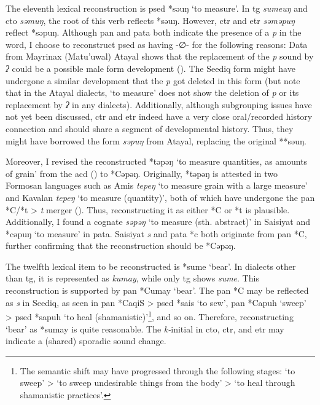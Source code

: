 The eleventh lexical reconstruction is \acl{psed} *səuŋ `to measure'. In \acl{tg} \textit{sumeuŋ} and \acl{cto} \textit{səmuŋ}, the root of this verb reflects *səuŋ. However, \acl{ctr} and \acl{etr} \textit{səməpuŋ} reflect *səpuŋ. Although \acl{pan} and \acl{pata} both indicate the presence of a \textit{p} in the word, I choose to reconstruct \acl{psed} as having -∅- for the following reasons: Data from Mayrinax (Matu'uwal) Atayal shows that the replacement of the \textit{p} sound by \textit{ʔ} could be a possible male form development (\cite[12]{li1983gender}). The Seediq form might have undergone a similar development that the \textit{p} got deleted in this form (but note that in the Atayal dialects, `to measure' does not show the deletion of \textit{p} or its replacement by \textit{ʔ} in any dialects). Additionally, although subgrouping issues have not yet been discussed, \acl{ctr} and \acl{etr} indeed have a very close oral/recorded history connection and should share a segment of developmental history. Thus, they might have borrowed the form \textit{səpuŋ} from Atayal, replacing the original **səuŋ.

Moreover, I revised the reconstructed *təpəŋ `to measure quantities, as amounts of grain' from the \ac{acd} (\cite{ACD}) to *Cəpəŋ. Originally, *təpəŋ is attested in two Formosan languages such as Amis \textit{tepeŋ} `to measure grain with a large measure' and Kavalan \textit{tepeŋ} `to measure (quantity)', both of which have undergone the \acs{pan} *C/*t > \textit{t} merger (\cite[44]{blust1999subgrouping}). Thus, reconstructing it as either *C or *t is plausible. Additionally, I found a cognate \textit{səpəŋ} `to measure (sth. abstract)' in Saisiyat and *cəpuŋ `to measure' in \acl{pata}. Saisiyat \textit{s} and \acl{pata} *c both originate from \acs{pan} *C, further confirming that the reconstruction should be *Cəpəŋ.


The twelfth lexical item to be reconstructed is *sume `bear'. In dialects other than \acl{tg}, it is represented as \textit{kumay}, while only \acl{tg} shows \textit{sume}. This reconstruction is supported by \acs{pan} *Cumay `bear'. The \acs{pan} *C may be reflected as \textit{s} in Seediq, as seen in \acs{pan} *CaqiS > \acs{psed} *sais `to sew', \acs{pan} *Capuh `sweep' > \acs{psed} *sapuh `to heal (shamanistic)'\footnote{The semantic shift may have progressed through the following stages: `to sweep' > `to sweep undesirable things from the body' > `to heal through shamanistic practices'.}, and so on. Therefore, reconstructing `bear' as *sumay is quite reasonable. The \textit{k-}initial in \acl{cto}, \acl{ctr}, and \acl{etr} may indicate a (shared) sporadic sound change.

